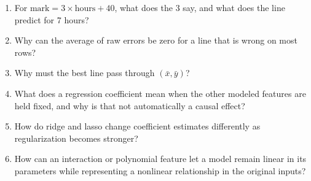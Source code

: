 \begin{quickcheck}
\begin{enumerate}
  \item For $\text{mark}=3\times\text{hours}+40$, what does the 3 say, and what does the line predict for 7 hours?
  \item Why can the average of raw errors be zero for a line that is wrong on most rows?
  \item Why must the best line pass through $(\bar{x},\bar{y})$?
  \item What does a regression coefficient mean when the other modeled features are held fixed, and why is that not automatically a causal effect?
  \item How do ridge and lasso change coefficient estimates differently as regularization becomes stronger?
  \item How can an interaction or polynomial feature let a model remain linear in its parameters while representing a nonlinear relationship in the original inputs?
\end{enumerate}
\end{quickcheck}
